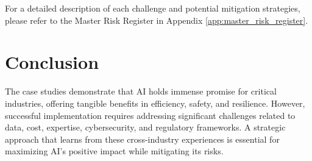 For a detailed description of each challenge and potential mitigation strategies, please refer to the Master Risk Register in Appendix \ref{app:master_risk_register}.

\section{Conclusion}
The case studies demonstrate that AI holds immense promise for critical industries, offering tangible benefits in efficiency, safety, and resilience. However, successful implementation requires addressing significant challenges related to data, cost, expertise, cybersecurity, and regulatory frameworks. A strategic approach that learns from these cross-industry experiences is essential for maximizing AI's positive impact while mitigating its risks.
